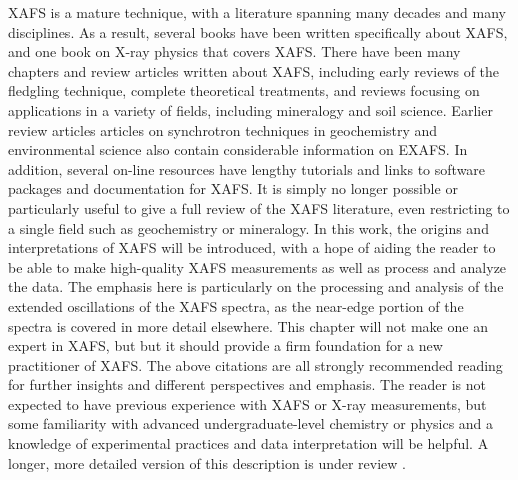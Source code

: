 XAFS is a mature technique, with a literature spanning many decades and
many disciplines.  As a result, several
books\cite{Teo1986,KoningsbergerPrins1988,GBunker2010,Calvin2013} have been
written specifically about XAFS, and one book on X-ray
physics\cite{AlsNielson2001} that covers XAFS.  There have been many
chapters and review articles written about XAFS, including early reviews of
the fledgling technique\cite{SternHeald1983}, complete theoretical
treatments\cite{RehrAlbersRMP2000}, and reviews focusing on applications in
a variety of fields, including mineralogy\cite{BrownRIMG1988} and soil
science\cite{Kelly2008}.  Earlier review articles
articles\cite{SuttonRIMG2002,ManceauRIMG2002} on synchrotron techniques in
geochemistry and environmental science also contain considerable
information on EXAFS.  In addition, several on-line
resources\cite{xafsorg,ixasportal} have lengthy tutorials and links to
software packages and documentation for XAFS.  It is simply no longer
possible or particularly useful to give a full review of the XAFS
literature, even restricting to a single field such as geochemistry or
mineralogy.  In this work, the origins and interpretations of XAFS will be
introduced, with a hope of aiding the reader to be able to make
high-quality XAFS measurements as well as process and analyze the data.
The emphasis here is particularly on the processing and analysis of the
extended oscillations of the XAFS spectra, as the near-edge portion of the
spectra is covered in more detail elsewhere.  This chapter will not make
one an expert in XAFS, but but it should provide a firm foundation for a
new practitioner of XAFS.  The above citations are all strongly recommended
reading for further insights and different perspectives and emphasis.  The
reader is not expected to have previous experience with XAFS or X-ray
measurements, but some familiarity with advanced undergraduate-level
chemistry or physics and a knowledge of experimental practices and data
interpretation will be helpful. A longer, more detailed version of this
description is under review \cite{NewvilleRIMG2013}.

